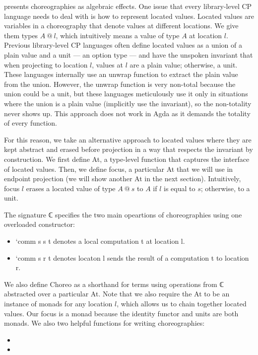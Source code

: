  presents choreographies as algebraic effects.
%
One issue that every library-level CP language needs to deal with is how to represent located values.
%
Located values are variables in a choreography that denote values at different locations.
%
We give them types $A \ @ \ l$, which intuitively means a value of type $A$ at location $l$.
%
Previous library-level CP languages often define located values as a union of a plain value and a unit --- an option type --- and have the unspoken invariant that when projecting to location $l$, values at $l$ are a plain value; otherwise, a unit.
%
These languages internally use an unwrap function to extract the plain value from the union.
%
However, the unwrap function is very non-total because the union could be a unit, but these languages meticulously use it only in situations where the union is a plain value (implicitly use the invariant), so the non-totality never shows up.
%
This approach does not work in Agda as it demands the totality of every function.

For this reason, we take an alternative approach to located values where they are kept abstract and erased before projection in a way that respects the invariant by construction.
%
We first define At, a type-level function that captures the interface of located values.
%
Then, we define focus, a particular At that we will use in endpoint projection (we will show another At in the next section).
%
Intuitively, focus $l$ erases a located value of type $A \ @ \ s$ to $A$ if $l$ is equal to $s$; otherwise, to a unit.

The signature ℂ specifies the two main opeartions of choreographies using one overloaded constructor:
%
\begin{itemize}
\item
  `comm s s t denotes a local computation t at location l.
\item
  `comm s r t denotes locaton l sends the result of a computation t to location r.
\end{itemize}

We also define Choreo as a shorthand for terms using operations from ℂ abstracted over a particular At.
%
Note that we also require the At to be an instance of monads for any location $l$, which allows us to chain together located values.
%
Our focus is a monad because the identity functor and units are both monads.
%
We also two helpful functions for writing choreographies:
%
\begin{itemize}
\item
\item
\end{itemize}

